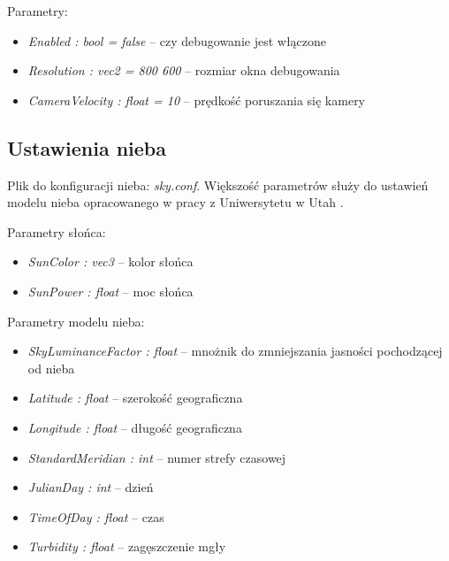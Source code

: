 \documentclass[inz,longabstract]{iithesis}
\begin{document}
        Parametry:
        \begin{itemize}
            \item \textit{Enabled : bool = false} -- czy debugowanie jest włączone
            \item \textit{Resolution : vec2 = 800 600} -- rozmiar okna debugowania
            \item \textit{CameraVelocity : float = 10} -- prędkość poruszania się kamery 
        \end{itemize}
        
        \subsection{Ustawienia nieba}
        Plik do konfiguracji nieba: \textit{sky.conf}. Większość parametrów służy do ustawień modelu nieba opracowanego w pracy z Uniwersytetu w Utah \cite{sky}.
        
        Parametry słońca:
        \begin{itemize}
            \item \textit{SunColor : vec3} -- kolor słońca 
            \item \textit{SunPower : float} -- moc słońca
        \end{itemize}
        
        Parametry modelu nieba:
        \begin{itemize}
            \item \textit{SkyLuminanceFactor : float} -- mnożnik do zmniejszania jasności pochodzącej od nieba
            \item \textit{Latitude : float} -- szerokość geograficzna
            \item \textit{Longitude : float} -- długość geograficzna
            \item \textit{StandardMeridian : int} -- numer strefy czasowej
            \item \textit{JulianDay : int} -- dzień
            \item \textit{TimeOfDay : float} -- czas
            \item \textit{Turbidity : float} -- zagęszczenie mgły 
        \end{itemize}
        
\end{document}
